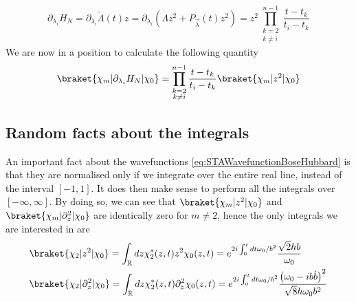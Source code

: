 \begin{equation}
	\label{eq:GradientLambda}
	\partial_{\lambda_{i}} H_{N}=\partial_{\lambda_{i}} \tilde{ \Lambda }(t)z = \partial_{\lambda_{i}} \left(\Lambda z^2 + P_{\vec{ \lambda }}(t)z^2    \right) =z^2\prod_{\substack{k=2\\k\neq i }}^{n-1}\frac{t-t_{k}}{t_{i} - t_{k}}
\end{equation}
We are now in a position to calculate the following quantity
\begin{equation}
	\label{eq:KnOverSpace}
	\braket{\chi_{m}|\partial_{\lambda_{i}} H_{N}|\chi_{0}} = \prod_{\substack{k=2\\k\neq i }}^{n-1}\frac{t-t_{k}}{t_{i} - t_{k}} \braket{\chi_{m}|z^2 |\chi_{0}}
\end{equation}
\subsection{Random facts about the integrals}
An important fact about the wavefunctions \cref{eq:STAWavefunctionBoseHubbard} is that they are normalised only if we integrate over the entire real line, instead of the interval $ [-1,1] $.
It does then make sense to perform all the integrals over $ [-\infty, \infty] $.
By doing so, we can see that $ \braket{\chi_{m}|z^2|\chi_{0}} $ and $ \braket{\chi_{m}|\partial_z^2|\chi_{0}} $ are identically zero for $ m \neq 2 $, hence the only integrals we are interested in are
\begin{align}
	  & \braket{\chi_{2}|z^2|\chi_{0}} =
	\int_{\mathbb{R}}dz \chi_{2}^{*}(z,t) z^2 \chi_{0}(z,t) =
	e^{2i\int_{0}^{t}dt\omega_{0}/b^2 }\frac{\sqrt{2}h b   }{\omega_0}\\
	  & \braket{\chi_{2}|\partial_z^2|\chi_{0}} =
	\int_{\mathbb{R}}dz \chi_{2}^{*}(z,t) \partial_z^2 \chi_{0}(z,t)=
	e^{2i\int_{0}^{t}dt\omega_{0}/b^2 }\frac{\left(\omega_0 - ib\dot{b}\right)^2}{ \sqrt{8} h\omega_0b^2 }
\end{align}
